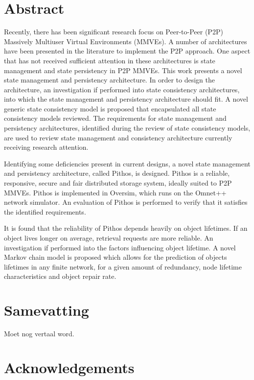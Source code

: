 
\chapter*{Abstract}
Recently, there has been significant research focus on Peer-to-Peer (P2P) Massively Multiuser Virtual Environments (MMVEs). A number of architectures have been presented in the literature to implement the P2P approach. One aspect that has not received sufficient attention in these architectures is state management and state persistency in P2P MMVEs. This work presents a novel state management and persistency architecture. In order to design the architecture, an investigation if performed into state consistency architectures, into which the state management and persistency architecture should fit. A novel generic state consistency model is proposed that encapsulated all state consistency models reviewed. The requirements for state management and persistency architectures, identified during the review of state consistency models, are used to review state management and consistency architecture currently receiving research attention.

Identifying some deficiencies present in current designs, a novel state management and persistency architecture, called Pithos, is designed. Pithos is a reliable, responsive, secure and fair distributed storage system, ideally suited to P2P MMVEs. Pithos is implemented in Oversim, which runs on the Omnet++ network simulator. An evaluation of Pithos is performed to verify that it satisfies the identified requirements.

It is found that the reliability of Pithos depends heavily on object lifetimes. If an object lives longer on average, retrieval requests are more reliable. An investigation if performed into the factors influencing object lifetime. A novel Markov chain model is proposed which allows for the prediction of objects lifetimes in any finite network, for a given amount of redundancy, node lifetime characteristics and object repair rate.


\chapter*{Samevatting}

Moet nog vertaal word.


\chapter{Acknowledgements}%

